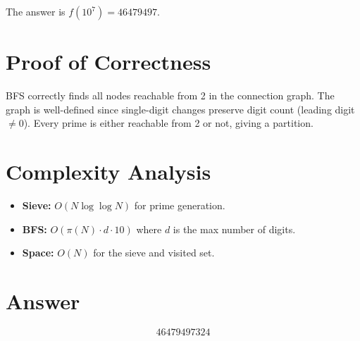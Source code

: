 \documentclass[11pt]{article}
\begin{document}
The answer is $f(10^7) = 46479497$.

\section{Proof of Correctness}
BFS correctly finds all nodes reachable from 2 in the connection graph. The graph is well-defined since single-digit changes preserve digit count (leading digit $\neq 0$). Every prime is either reachable from 2 or not, giving a partition.

\section{Complexity Analysis}
\begin{itemize}
    \item \textbf{Sieve:} $O(N \log\log N)$ for prime generation.
    \item \textbf{BFS:} $O(\pi(N) \cdot d \cdot 10)$ where $d$ is the max number of digits.
    \item \textbf{Space:} $O(N)$ for the sieve and visited set.
\end{itemize}

\section{Answer}

\[
\boxed{46479497324}
\]
\end{document}
